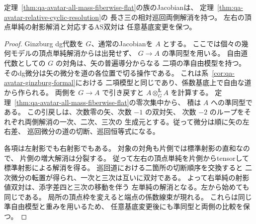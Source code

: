 \begin{proposition}[指定十二矢族の両側解消と標準単純]
\label{prop:qa-avatar-presented-as-cyclic-resolution}
定理~\ref{thm:qa-avatar-all-mass-fiberwise-flat}の族のJacobianは、
定理~\ref{thm:qa-avatar-relative-cyclic-resolution}の
長さ三の相対巡回両側解消を持つ。
左右の頂点単純の射影解消と対応するAS双対は
任意基底変更を保つ。
\end{proposition}
\begin{proof}
Ginzburg dg代数を $G$、通常のJacobianを $A$ とする。
ここでは個々の幾何モデルの頂点単純解消からは出発せず、
$G\to A$ の準同型を用いる。
自由道代数としての $G$ の対角は、矢の普遍導分からなる
二項の準自由模型を持つ。
そのdg微分は矢の微分を道の各位置で切る操作である。
これは系~\ref{cor:qa-avatar-ginzburg-formal}における
二項模型と同じであり、係数基底上で自由な道から作られる。
両側を $G\to A$ で引き戻すと
$A\otimes_G^{\mathbf L} A$ を計算する。
定理~\ref{thm:qa-avatar-all-mass-fiberwise-flat}の零次集中から、
積は $A$ への準同型である。
この引戻しは、次数零の矢、次数 $-1$ の双対矢、
次数 $-2$ のループをそれぞれ両側解消の一次、二次、三次の
生成元とする。従って微分は順に矢の左右差、
巡回微分の道の切断、巡回恒等式になる。

各項は左射影でも右射影でもある。
対象の対角も片側では標準射影の直和なので、
片側の増大解消は分裂する。
従って左右の頂点単純を片側からtensorして
標準射影による解消を得る。
巡回道における二箇所の切断順序を交換すると
二次微分の転置が得られ、一次と三次は互いに双対である。
よって右単純の射影値双対は、添字差四と三次の移動を伴う
左単純の解消となる。左から始めても同じである。
局所の頂点枠を変えると端点の係数線束が現れる。
これらは同じ準自由模型と重みを用いるため、
任意基底変更後にも準同型と両側の比較を保つ。
\end{proof}

